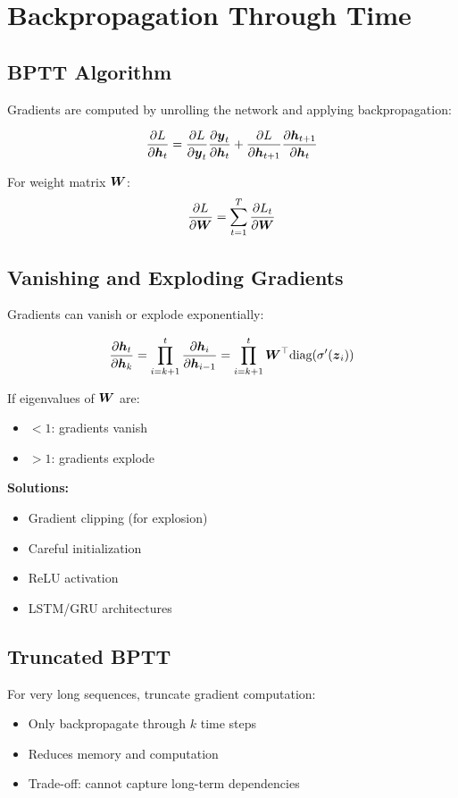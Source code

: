 
\section{Backpropagation Through Time}
\label{sec:bptt}

\subsection{BPTT Algorithm}

Gradients are computed by unrolling the network and applying backpropagation:

\begin{equation}
\frac{\partial L}{\partial \boldsymbol{h}_t} = \frac{\partial L}{\partial \boldsymbol{y}_t} \frac{\partial \boldsymbol{y}_t}{\partial \boldsymbol{h}_t} + \frac{\partial L}{\partial \boldsymbol{h}_{t+1}} \frac{\partial \boldsymbol{h}_{t+1}}{\partial \boldsymbol{h}_t}
\end{equation}

For weight matrix $\boldsymbol{W}$:
\begin{equation}
\frac{\partial L}{\partial \boldsymbol{W}} = \sum_{t=1}^{T} \frac{\partial L_t}{\partial \boldsymbol{W}}
\end{equation}

\subsection{Vanishing and Exploding Gradients}

Gradients can vanish or explode exponentially:

\begin{equation}
\frac{\partial \boldsymbol{h}_t}{\partial \boldsymbol{h}_k} = \prod_{i=k+1}^{t} \frac{\partial \boldsymbol{h}_i}{\partial \boldsymbol{h}_{i-1}} = \prod_{i=k+1}^{t} \boldsymbol{W}^\top \text{diag}(\sigma'(\boldsymbol{z}_i))
\end{equation}

If eigenvalues of $\boldsymbol{W}$ are:
\begin{itemize}
    \item $< 1$: gradients vanish
    \item $> 1$: gradients explode
\end{itemize}

\textbf{Solutions:}
\begin{itemize}
    \item Gradient clipping (for explosion)
    \item Careful initialization
    \item ReLU activation
    \item LSTM/GRU architectures
\end{itemize}

\subsection{Truncated BPTT}

For very long sequences, truncate gradient computation:
\begin{itemize}
    \item Only backpropagate through $k$ time steps
    \item Reduces memory and computation
    \item Trade-off: cannot capture long-term dependencies
\end{itemize}

